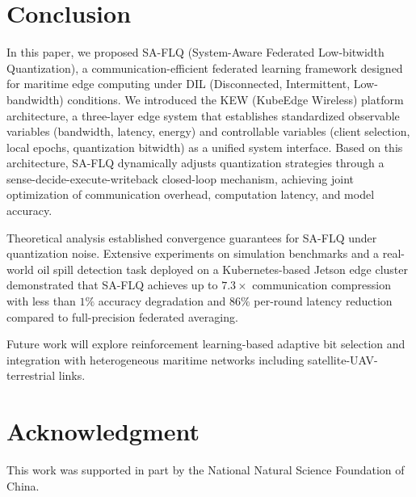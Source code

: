 \documentclass[journal]{IEEEtran}
\begin{document}
\section{Conclusion}
\label{sec:conclusion}

In this paper, we proposed SA-FLQ (System-Aware Federated Low-bitwidth Quantization), a communication-efficient federated learning framework designed for maritime edge computing under DIL (Disconnected, Intermittent, Low-bandwidth) conditions. We introduced the KEW (KubeEdge Wireless) platform architecture, a three-layer edge system that establishes standardized observable variables (bandwidth, latency, energy) and controllable variables (client selection, local epochs, quantization bitwidth) as a unified system interface. Based on this architecture, SA-FLQ dynamically adjusts quantization strategies through a sense-decide-execute-writeback closed-loop mechanism, achieving joint optimization of communication overhead, computation latency, and model accuracy.

Theoretical analysis established convergence guarantees for SA-FLQ under quantization noise. Extensive experiments on simulation benchmarks and a real-world oil spill detection task deployed on a Kubernetes-based Jetson edge cluster demonstrated that SA-FLQ achieves up to $7.3\times$ communication compression with less than $1\%$ accuracy degradation and $86\%$ per-round latency reduction compared to full-precision federated averaging.

Future work will explore reinforcement learning-based adaptive bit selection and integration with heterogeneous maritime networks including satellite-UAV-terrestrial links.

\section*{Acknowledgment}
This work was supported in part by the National Natural Science Foundation of China.



\end{document}
